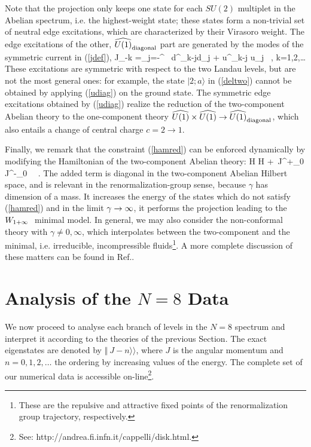 Note that the projection only keeps one state for each $SU(2)$ multiplet
in the Abelian spectrum, i.e. the highest-weight state; 
these states form a non-trivial set of neutral edge excitations, 
which are characterized by their Virasoro weight.
The edge excitations of the other, $\u1_{\rm diagonal}$ part are 
generated by the modes of the symmetric current in (\ref{jdef}),
\beq
J_{-k} =\sum_{j=-\infty}^{\infty} \ 
d^\dagger_{k-j}d_j + u^\dagger_{k-j} u_j \ , \qquad k=1,2,\dots 
\label{udiag}
\eeq
These excitations are symmetric with respect to the two Landau
levels, but are not the most general ones: for example, the state
$\vert 2;a \rangle$ in (\ref{deltwo}) cannot be obtained by applying
(\ref{udiag}) on the ground state.
The symmetric edge excitations obtained by (\ref{udiag}) realize
the reduction of the two-component Abelian theory to the
one-component theory $\u1\times\u1 \to \u1_{\rm diagonal}$,
which also entails a change of central charge $c=2 \to 1$.
 
Finally, we remark that the constraint (\ref{hamred}) can 
be enforced dynamically by modifying
the Hamiltonian of the two-component Abelian theory:
\beq
H \to H +\gamma\ J^+_0 J^-_0 \ \ .
\label{ham}\eeq
The added term is diagonal in the two-component Abelian Hilbert space, 
and is relevant in the renormalization-group sense, because $\gamma$
has dimension of a mass.
It increases the energy of the states which do not satisfy (\ref{hamred})
and in the limit $\gamma\to\infty$, it performs the projection leading to
the $W_{1+\infty}\ $ minimal model.
In general, we may also consider the non-conformal theory with
$\gamma\neq 0,\infty$, which
interpolates between the two-component and the minimal, i.e. 
irreducible, incompressible fluids\footnote{
These are the repulsive and attractive fixed points of the renormalization
group trajectory, respectively.}.
A more complete discussion of these matters can be found in Ref.\cite{cz}. 



\section{Analysis of the $N=8$ Data}

We now proceed to analyse each branch of levels in the $N=8$
spectrum and interpret it according to the theories of the previous Section.
The exact eigenstates are denoted by $\Vert\ J - n \rangle\rangle $,
where $J$ is the angular momentum and $n=0,1,2,\dots$ the ordering
by increasing values of the energy. 
The complete set of our numerical data is accessible on-line\footnote{
See: http://andrea.fi.infn.it/cappelli/disk.html.}.

